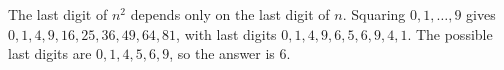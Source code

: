 The last digit of $n^2$ depends only on the last digit of $n$. Squaring $0,1,\dots,9$ gives $0,1,4,9,16,25,36,49,64,81$, with last digits $0,1,4,9,6,5,6,9,4,1$. The possible last digits are $0,1,4,5,6,9$, so the answer is $\boxed{6}$.
